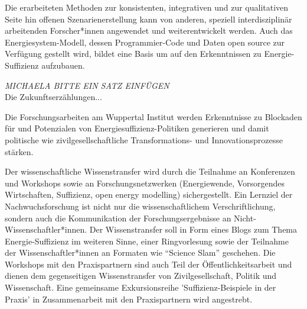 \documentclass[a4paper,11pt,twoside]{scrartcl}
\begin{document}
Die erarbeiteten Methoden zur konsistenten, integrativen und zur qualitativen Seite hin offenen Szenarienerstellung kann von anderen, speziell interdisziplinär arbeitenden Forscher*innen angewendet und weiterentwickelt werden. Auch das Energiesystem-Modell, dessen Programmier-Code und Daten open source zur Verfügung gestellt wird, bildet eine Basis um auf den Erkenntnissen zu Energie-Suffizienz aufzubauen. 

\textit{MICHAELA BITTE EIN SATZ EINFÜGEN}\\
Die Zukunftserzählungen... 

Die Forschungsarbeiten am Wuppertal Institut werden Erkenntnisse zu Blockaden für und Potenzialen von Energiesuffizienz-Politiken generieren und damit politische wie zivilgesellschaftliche Transformations- und Innovationsprozesse stärken.


Der wissenschaftliche Wissenstransfer wird durch die Teilnahme an Konferenzen und Workshops sowie an Forschungsnetzwerken (Energiewende, Vorsorgendes Wirtschaften, Suffizienz, open energy modelling) sichergestellt. 
Ein Lernziel der Nachwuchsforschung ist nicht nur die wissenschaftlichem Verschriftlichung, sondern auch die Kommunikation der Forschungsergebnisse an Nicht-Wissenschaftler*innen. Der Wissenstransfer soll in Form eines Blogs zum Thema Energie-Suffizienz im weiteren Sinne, einer Ringvorlesung sowie der Teilnahme der Wissenschaftler*innen an Formaten wie ``Science Slam'' geschehen. Die Workshops mit den Praxispartnern sind auch Teil der Öffentlichkeitsarbeit und dienen dem gegenseitigen Wissenstransfer von Zivilgesellschaft, Politik und Wissenschaft. Eine gemeinsame Exkursionsreihe 'Suffizienz-Beispiele in der Praxis' in Zusammenarbeit mit den Praxispartnern wird angestrebt.
\end{document}
